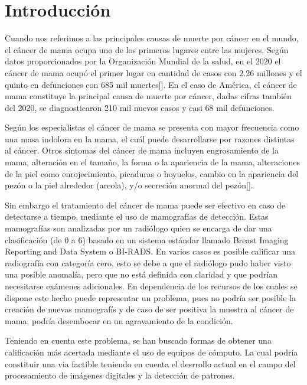 \chapter*{Introducción}\label{chapter:introduction}

\par Cuando nos referimos a las principales causas de muerte por c\'ancer en el mundo, el c\'ancer de mama ocupa uno de los primeros lugares entre las mujeres. Seg\'un datos proporcionados por la Organizaci\'on Mundial de la salud, en el 2020 el c\'ancer de mama ocup\'o el primer lugar en cantidad de casos con $2.26$ millones y el quinto en defunciones con 685 mil muertes[\cite{16}]. En el caso de Am\'erica, el c\'ancer de mama constituye la principal causa de muerte por c\'ancer, dadas cifras tambi\'en del 2020, se diagnosticaron 210 mil nuevos casos y casi 68 mil defunciones.

\par Seg\'un los especialistas el cáncer de mama se presenta con mayor frecuencia como una masa indolora en la mama, el cu\'al puede desarrollarse por razones distintas al cáncer. Otros síntomas del cáncer de mama incluyen engrosamiento de la mama, alteración en el tamaño, la forma o la apariencia de la mama, alteraciones de la piel como enrojecimiento, picaduras o hoyuelos, cambio en la apariencia del pezón o la piel alrededor (areola), y/o secreción anormal del pezón[\cite{17}].

\par Sin embargo el tratamiento del c\'ancer de mama puede ser efectivo en caso de detectarse a tiempo, mediante el uso de mamograf\'ias de detecci\'on. Estas mamograf\'ias son analizadas por un radi\'ologo quien se encarga de dar una clasificaci\'on (de 0 a 6) basado en un sistema est\'andar llamado Breast Imaging Reporting and Data System o BI-RADS. En varios casos es posible calificar una radiograf\'ia con categor\'ia cero, esto se debe a que el radi\'ologo pudo haber visto una posible anomalía, pero que no está definida con claridad y que podr\'ian necesitarse exámenes adicionales. En dependencia de los recursos de los cuales se dispone este hecho puede representar un problema, pues no podr\'ia ser posible la creaci\'on de nuevas mamograf\'is y de caso de ser positiva la muestra al c\'ancer de mama, podr\'ia desembocar en un agravamiento de la condici\'on.

\par Teniendo en cuenta este problema, se han buscado formas de obtener una calificaci\'on m\'as acertada mediante el uso de equipos de c\'omputo. La cual podr\'ia constituir una via factible teniendo en cuenta el desrrollo actual en el campo del procesamiento de im\'agenes digitales y la detecci\'on de patrones.

